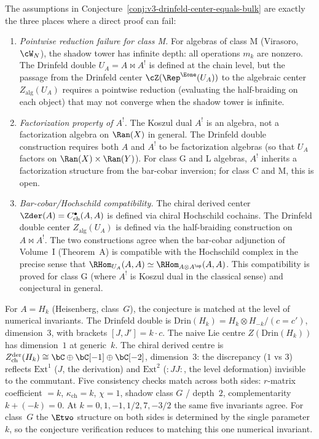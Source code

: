 \begin{remark}
\label{rem:drinfeld-center-bulk-obstructions}
The assumptions in
Conjecture~\ref{conj:v3-drinfeld-center-equals-bulk} are exactly the
three places where a direct proof can fail:
\begin{enumerate}[label=(\roman*)]
 \item \emph{Pointwise reduction failure for class M.}
 For algebras of class M (Virasoro, $\cW_N$), the shadow tower
 has infinite depth: all operations $m_k$ are nonzero.
 The Drinfeld double $U_A = A \bowtie A^!$ is defined at the
 chain level, but the passage from the Drinfeld center
 $\cZ(\Rep^{\Eone}(U_A))$ to the algebraic center
 $Z_{\mathrm{alg}}(U_A)$
 requires a pointwise reduction (evaluating the half-braiding
 on each object) that may not converge when the shadow tower
 is infinite.
 \item \emph{Factorization property of $A^!$.}
 The Koszul dual $A^!$ is an algebra, not a factorization
 algebra on $\Ran(X)$ in general. The Drinfeld double
 construction requires both $A$ and $A^!$ to be factorization
 algebras (so that $U_A$ factors on $\Ran(X) \times \Ran(Y)$).
 For class G and L algebras, $A^!$ inherits a factorization
 structure from the bar-cobar inversion; for class C and M,
 this is open.
 \item \emph{Bar-cobar/Hochschild compatibility.}
 The chiral derived center $\Zder(A) = C^\bullet_{\mathrm{ch}}(A,A)$
 is defined via chiral Hochschild cochains. The Drinfeld
 double center $Z_{\mathrm{alg}}(U_A)$ is defined via the half-braiding
 construction on $A \bowtie A^!$. The two constructions agree
 when the bar-cobar adjunction of Volume~I (Theorem~A) is
 compatible with the Hochschild complex in the precise sense
 that
 $\RHom_{U_A}(A, A) \simeq \RHom_{A \otimes A^{\op}}(A, A)$.
 This compatibility is proved for class G (where $A^!$ is
 Koszul dual in the classical sense) and conjectural in
 general.
\end{enumerate}
\end{remark}

\begin{remark}
\label{rem:drinfeld-center-heisenberg-verification}
For $A = H_k$ (Heisenberg, class~$G$), the conjecture is
matched at the level of numerical invariants. The Drinfeld
double is $\mathrm{Drin}(H_k) = H_k \otimes H_{-k} / (c = c')$,
dimension~$3$, with brackets $[J, J'] = k \cdot c$.
The naive Lie centre $Z(\mathrm{Drin}(H_k))$ has dimension~$1$
at generic~$k$.
The chiral derived centre is
$Z^{\mathrm{der}}_{\mathrm{ch}}(H_k) \cong
\bC \oplus \bC[-1] \oplus \bC[-2]$, dimension~$3$:
the discrepancy ($1$ vs $3$) reflects $\mathrm{Ext}^1$
($J$, the derivation) and $\mathrm{Ext}^2$ ($:JJ:$, the
level deformation) invisible to the commutant.
Five consistency checks match across both sides:
$r$-matrix coefficient $= k$, $\kappa_{\mathrm{ch}} = k$,
$\chi = 1$, shadow class $G$ / depth~$2$,
complementarity $k + (-k) = 0$. At
$k = 0, 1, -1, 1/2, 7, -3/2$ the same five invariants agree. For
class~$G$ the $\Etwo$ structure on both sides is
determined by the single parameter~$k$, so the conjecture
verification reduces to matching this one numerical
invariant.
\end{remark}


